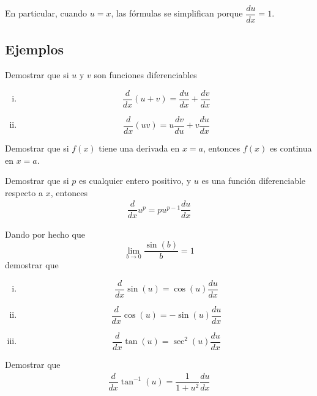 {}
  En particular, cuando $u=x$, las fórmulas se simplifican porque $\dfrac{du}{dx}=1$.

\subsection{Ejemplos}
{}
  \begin{problema}
   Demostrar que si $u$ y $v$ son funciones diferenciables
   \begin{enumerate}[(i)]
     \item \[\dfrac{d}{dx}\left( u+v \right) = 
     \dfrac{du}{dx}+\dfrac{dv}{dx}\] 
     
     \item \[\dfrac{d}{dx}\left( uv \right) = u\dfrac{dv}{du}+v\dfrac{du}{dx}
     \]
\end{enumerate}
  \end{problema}


{}
  \begin{problema}
   Demostrar que si $f(x)$ tiene una derivada en $x=a$, entonces $f(x)$ es continua en $x=a$.
  \end{problema}


{}
  \begin{problema}
   Demostrar que si $p$ es cualquier entero positivo, y $u$ es una función diferenciable respecto a $x$, entonces
   \begin{align*}
    \dfrac{d}{dx}u^{p}=pu^{p-1}\dfrac{du}{dx}
    \end{align*}
  \end{problema}


{}
\begin{problema}
   Dando por hecho que \[\lim_{b\to 0}\dfrac{\sin(b)}{b}=1\] demostrar que 
   \begin{enumerate}[(i)]
     \item \[\dfrac{d}{dx}\sin(u)=\cos(u)\dfrac{du}{dx}\] 
     \item \[\dfrac{d}{dx}\cos(u)=-\sin(u)\dfrac{du}{dx}\] 
     \item \[\dfrac{d}{dx}\tan(u)=\sec^{2}(u)\dfrac{du}{dx}\] 
     
\end{enumerate}
\end{problema}


{}
\begin{problema}
 
  Demostrar que 
  \begin{align*}
   \dfrac{d}{dx}\tan^{-1}\left( u \right) = 
   \dfrac{1}{1+u^{2}}\dfrac{du}{dx}
   \end{align*}
\end{problema}


